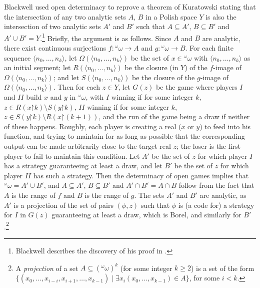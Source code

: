 \documentclass{book}%
\newcommand{\breals}{{^{\omega}}\omega}
\newcommand{\restrict}{\mathord{\upharpoonright}}
\begin{document}
Blackwell  used open determinacy to reprove
a theorem of Kuratowski  stating
that the intersection of any two analytic sets $A$, $B$ in
a Polish space $Y$ is also the intersection
of two analytic sets $A'$ and $B'$ such that $A \subseteq A'$, $B \subseteq B'$
and $A' \cup B' = Y$.\footnote{Blackwell describes the discovery of his
proof in \cite[p.~26]{AlbersAlexanderson}.}
Briefly, the argument is as follows.
Since $A$ and $B$ are analytic, there exist continuous surjections $f \colon \breals \to A$ and $g \colon \breals \to B$.
For each finite sequence $\langle n_{0}, \ldots, n_{k}\rangle$, let $\Omega(\langle
n_{0},\ldots, n_{k}\rangle)$ be the set of $x \in \breals$ with $\langle n_{0},\ldots,n_{k}\rangle$
as an initial segment; let
$R(\langle n_{0}, \ldots, n_{k}\rangle)$ be the closure (in $Y$) of the $f$-image of
$\Omega(\langle n_{0},\ldots, n_{k}\rangle)$; and let
$S(\langle n_{0}, \ldots, n_{k}\rangle)$ be the closure of the $g$-image of $\Omega(\langle n_{0},\ldots, n_{k}\rangle)$.
Then for each $z \in Y$, let $G(z)$ be the game where players $I$ and $II$ build $x$ and $y$ in $\breals$, with $I$ winning if for some integer $k$, $z \in R(x \restrict k) \setminus S(y \restrict k)$, $II$ winning if for some integer $k$,
$z \in S(y \restrict k) \setminus R(x \restrict (k+1))$, and the run of the game being a draw if neither of these happens.
Roughly, each player is creating a real ($x$ or $y$) to feed into his function, and trying to maintain for as long as possible that
the corresponding output can be made arbitrarily close to the target real $z$; the loser is the first player to fail to maintain this condition.
Let $A'$ be the set of $z$ for which player $I$ has a strategy guaranteeing at least a draw, and let $B'$
be the set of $z$ for which player $II$ has such a strategy. Then the determinacy of open games implies that
$\breals = A' \cup B'$, and $A \subseteq A'$,  $B \subseteq B'$ and $A' \cap B' = A \cap B$ follow from the fact that $A$ is the range of $f$ and $B$ is the range of $g$. The sets $A'$ and $B'$ are analytic, as $A'$ is a projection of the set of pairs $(\phi, z)$
such that $\phi$ is (a code for) a strategy for $I$ in $G(z)$ guaranteeing at least a draw, which is Borel, and similarly for $B'$.\footnote{A \emph{projection} of a set $A
\subseteq(\breals)^{k}$ (for some integer $k \geq 2$) is a set of the form $\{
(x_{0},\ldots,x_{i-i},x_{i+1},\ldots,x_{k-1}) \mid \exists x_i
(x_{0},\ldots,x_{k-1}) \in A\}$, for some $i < k$.}
\end{document}
